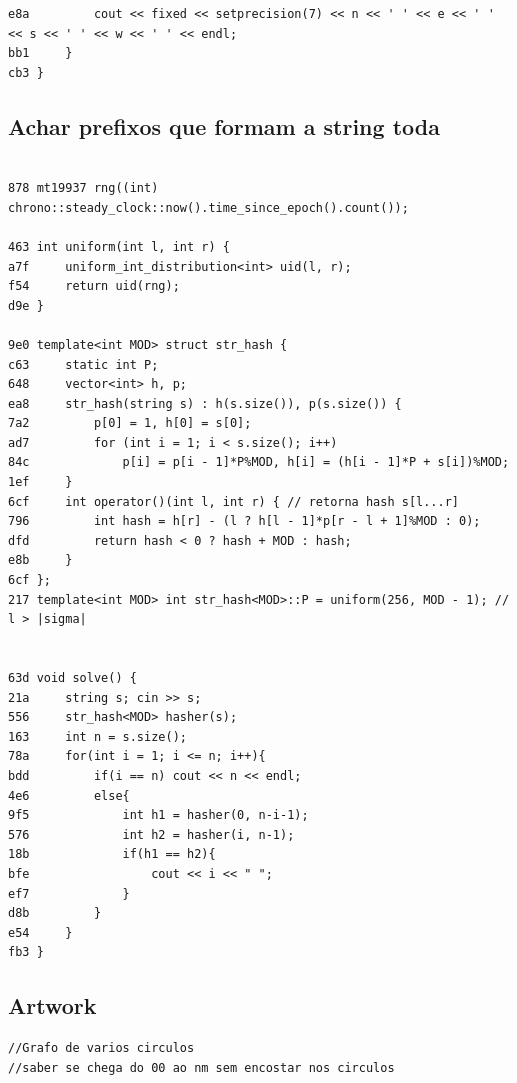 \documentclass[11pt, a4paper, twoside]{article}
\begin{document}
{\begin{lstlisting}
e8a         cout << fixed << setprecision(7) << n << ' ' << e << ' ' << s << ' ' << w << ' ' << endl;
bb1     }
cb3 }
\end{lstlisting}

\subsection{Achar prefixos que formam a string toda}
\begin{lstlisting}
 
878 mt19937 rng((int) chrono::steady_clock::now().time_since_epoch().count());
 
463 int uniform(int l, int r) {
a7f 	uniform_int_distribution<int> uid(l, r);
f54 	return uid(rng);
d9e }
 
9e0 template<int MOD> struct str_hash {
c63 	static int P;
648 	vector<int> h, p;
ea8 	str_hash(string s) : h(s.size()), p(s.size()) {
7a2 		p[0] = 1, h[0] = s[0];
ad7 		for (int i = 1; i < s.size(); i++)
84c 			p[i] = p[i - 1]*P%MOD, h[i] = (h[i - 1]*P + s[i])%MOD;
1ef 	}
6cf 	int operator()(int l, int r) { // retorna hash s[l...r]
796 		int hash = h[r] - (l ? h[l - 1]*p[r - l + 1]%MOD : 0);
dfd 		return hash < 0 ? hash + MOD : hash;
e8b 	}
6cf };
217 template<int MOD> int str_hash<MOD>::P = uniform(256, MOD - 1); // l > |sigma|
 
 
63d void solve() {
21a     string s; cin >> s;
556     str_hash<MOD> hasher(s);
163     int n = s.size();
78a     for(int i = 1; i <= n; i++){
bdd         if(i == n) cout << n << endl;
4e6         else{
9f5             int h1 = hasher(0, n-i-1);
576             int h2 = hasher(i, n-1);
18b             if(h1 == h2){
bfe                 cout << i << " ";
ef7             }
d8b         }
e54     }
fb3 }
\end{lstlisting}

\subsection{Artwork}
\begin{lstlisting}
//Grafo de varios circulos
//saber se chega do 00 ao nm sem encostar nos circulos


\end{lstlisting}}
\end{document}
